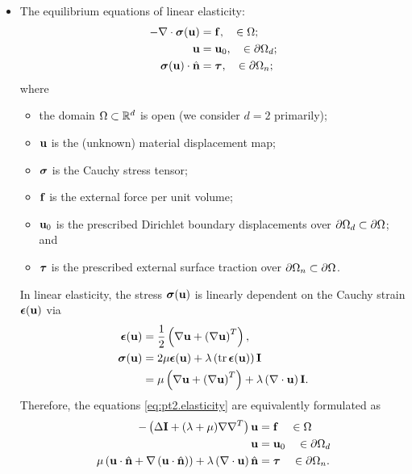 \begin{itemize}
\item The equilibrium equations of linear elasticity:
\begin{subequations} \label{eq:pt2.elasticity}
\begin{align}
-\nabla \cdot \boldsymbol{\sigma}(\mathbf{u}) & = \mathbf{f}, \quad \in \Omega; \\
\mathbf{u} & = \mathbf{u}_0, \quad \in \partial\Omega_d; \\
\boldsymbol{\sigma}(\mathbf{u}) \cdot \hat{\mathbf{n}} & = \boldsymbol{\tau}, \quad \in \partial\Omega_n;
\end{align}
\end{subequations}
where
\begin{itemize}
\item the domain $\Omega \subset \mathbb{R}^d$ is open (we consider $d = 2$ primarily);
\item $\mathbf{u}$ is the (unknown) material displacement map;
\item $\boldsymbol{\sigma}$ is the Cauchy stress tensor;
\item $\mathbf{f}$ is the external force per unit volume;
\item $\mathbf{u}_0$ is the prescribed Dirichlet boundary displacements over $\partial\Omega_d \subset \partial\Omega$; and
\item $\boldsymbol{\tau}$ is the prescribed external surface traction over $\partial\Omega_n \subset \partial\Omega$.
\end{itemize}
In linear elasticity, the stress $\boldsymbol{\sigma}(\mathbf{u})$ is linearly dependent on the Cauchy strain $\boldsymbol{\epsilon}(\mathbf{u})$ via
\begin{align*}
\boldsymbol{\epsilon}(\mathbf{u}) & = \frac{1}{2} \left( \nabla \mathbf{u} + \left( \nabla \mathbf{u} \right)^T \right), \\
\boldsymbol{\sigma}(\mathbf{u})   & = 2 \mu \boldsymbol{\epsilon}(\mathbf{u}) + \lambda \left( \operatorname{tr} \boldsymbol{\epsilon}(\mathbf{u}) \right) \mathbf{I} \\
                 & = \mu \left( \nabla \mathbf{u} + \left( \nabla \mathbf{u} \right)^T \right) + \lambda \left( \nabla \cdot \mathbf{u} \right) \mathbf{I}.
\end{align*}
Therefore, the equations \eqref{eq:pt2.elasticity} are equivalently formulated as
\begin{subequations} \label{eq:pt2.LE}
\begin{align}
-\left( \Delta \mathbf{I} + (\lambda + \mu) \nabla \nabla^T \right) \mathbf{u} & = \mathbf{f} \quad \in \Omega \label{eq:pt2.LE.PDE} \\
\mathbf{u} & = \mathbf{u}_0 \quad \in \partial\Omega_d \label{eq:pt2.LE.D} \\
\mu \left( \mathbf{u} \cdot \hat{\mathbf{n}} + \nabla \left( \mathbf{u} \cdot \hat{\mathbf{n}} \right) \right) + \lambda \left( \nabla \cdot \mathbf{u} \right) \hat{\mathbf{n}} & = \boldsymbol{\tau} \quad \in \partial\Omega_n \label{eq:pt2.LE.N}.
\end{align}
\end{subequations}

\end{itemize}

